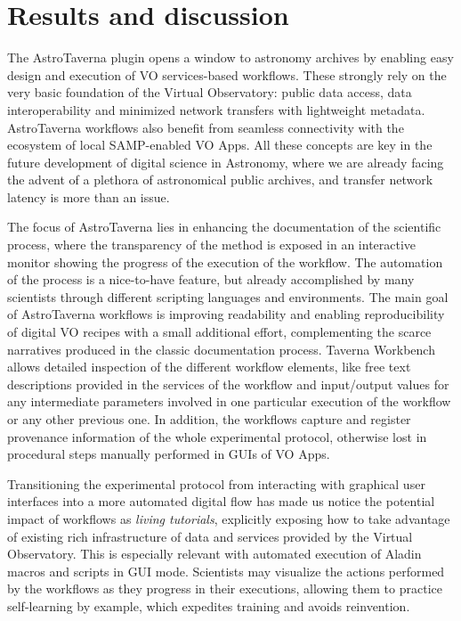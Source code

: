 \documentclass[final,authoryear,5p,times,twocolumn]{elsarticle}
\begin{document}
\section{Results and discussion}
\label{ResultsAndDiscussion}

The AstroTaverna plugin opens a window to astronomy archives by enabling easy design and execution of VO services-based workflows. These strongly rely on the very basic foundation of the Virtual Observatory: public data access, data interoperability and minimized network transfers with lightweight metadata. AstroTaverna workflows also benefit from seamless connectivity with the ecosystem of local SAMP-enabled VO Apps. All these concepts are key in the future development of digital science in Astronomy, where we are already facing the advent of a plethora of astronomical public archives, and transfer network latency is more than an issue. 

The focus of AstroTaverna lies in enhancing the documentation of the scientific process, where the transparency of the method is exposed in an interactive monitor showing the progress of the execution of the workflow. The automation of the process is a nice-to-have feature, but already accomplished by many scientists through different scripting languages and environments. The main goal of AstroTaverna workflows is improving readability and enabling reproducibility of digital VO recipes with a small additional effort, complementing the scarce narratives produced in the classic documentation process. Taverna Workbench allows detailed inspection of the different workflow elements, like free text descriptions provided in the services of the workflow and input/output values for any intermediate parameters involved in one particular execution of the workflow or any other previous one. In addition, the workflows capture and register provenance information of the whole experimental protocol, otherwise lost in procedural steps manually performed in GUIs of VO Apps.

Transitioning the experimental protocol from interacting with graphical user interfaces into a more automated digital flow has made us notice the potential impact of workflows as \textit{living tutorials}, explicitly exposing how to take advantage of existing rich infrastructure of data and services provided by the Virtual Observatory. This is especially relevant with automated execution of Aladin macros and scripts in GUI mode. Scientists may visualize the actions performed by the workflows as they progress in their executions, allowing them to practice self-learning by example, which expedites training and avoids reinvention. 
\end{document}
